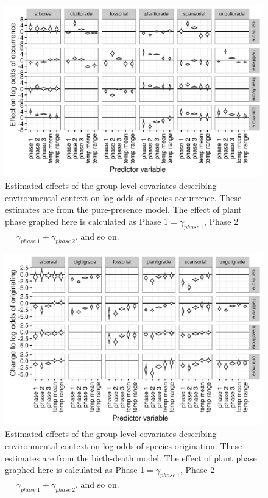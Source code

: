 \documentclass[12pt,letterpaper]{article}
\begin{document}
\begin{figure}[ht]
  \centering
  \includegraphics[width=\textwidth,height=0.4\textheight,keepaspectratio=true]{figure/group_on_ecotype}
  \caption[Effects of group-level covariates on log-odds of ecotype occurrence as estimated from the pure-presence model]{Estimated effects of the group-level covariates describing environmental context on log-odds of species occurrence. These estimates are from the pure-presence model. The effect of plant phase graphed here is calculated as Phase 1\( = \gamma_{phase\ 1}\), Phase 2\( = \gamma_{phase\ 1} + \gamma_{phase\ 2}\), and so on.} 
  \label{fig:group_pure_presence}
\end{figure}

\begin{figure}[ht]
  \centering
  \includegraphics[width=\textwidth,height=0.4\textheight,keepaspectratio=true]{figure/group_on_origin_bd}
  \caption[Effects of group-level covariates on log-odds of ecotype origination as estimated from the birth-death model]{Estimated effects of the group-level covariates describing environmental context on log-odds of species origination. These estimates are from the birth-death model. The effect of plant phase graphed here is calculated as Phase 1\( = \gamma_{phase\ 1}\), Phase 2\( = \gamma_{phase\ 1} + \gamma_{phase\ 2}\), and so on.} 
  \label{fig:group_origin_bd}
\end{figure}
\end{document}

